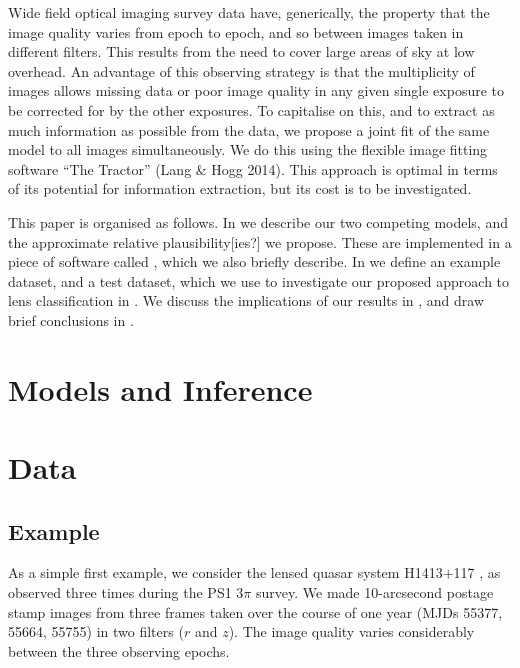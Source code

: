 \documentclass[useAMS,usenatbib]{mn2e}
\begin{document}
Wide field optical imaging survey data have, generically, the  property
that the image quality varies from epoch to epoch, and so between images
taken in different filters. This results from the need to cover large areas
of sky at low overhead. An advantage of this observing strategy is that the
multiplicity of images allows missing data or poor image quality in any
given single exposure to be corrected for by the other exposures. To
capitalise on this, and to extract as much information as possible from the
data, we propose a joint fit of the same model to all images
simultaneously. We do this using the flexible image fitting software ``The
Tractor'' (Lang \& Hogg 2014). This approach is optimal in terms of its
potential for information extraction, but its cost is to be investigated.

This paper is organised as follows. In  we describe our two
competing models, and the approximate relative plausibility[ies?] we
propose. These are implemented in a piece of software called \LT, which we
also briefly describe. In  we define an example dataset,
and a test dataset, which we use to investigate our proposed approach to
lens classification in . We discuss the implications of
our results in , and draw brief conclusions in
.



\section{Models and Inference}
\label{sec:model}



\section{Data}
\label{sed:data}


\subsection{Example}
\label{sec:data:example}

As a simple first example, we consider the lensed quasar system H1413$+$117
\citep{H1413}, as observed three times during the PS1 $3\pi$ survey. We 
made 10-arcsecond postage stamp images from three frames taken over the
course of one year (MJDs  55377, 55664, 55755) in two filters ($r$ and
$z$). The image quality varies considerably between the three observing
epochs.
\end{document}
